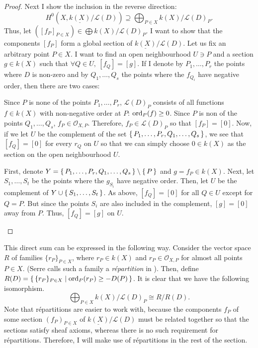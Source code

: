 \begin{proof}
  Next I show the inclusion in the reverse direction:
  \[
    H^{0}(X,\underline{k(X)}/\mathcal{L}(D))\supseteq\bigoplus_{P\in X}
    k(X)/\mathcal{L}(D)_{P}.
  \]
  Thus, let $([f_{P}]_{P\in X})\in\displaystyle\bigoplus
  k(X)/\mathcal{L}(D)_{P}$. I want to show that the components $[f_{P}]$
  form a global section of $\underline{k(X)}/\mathcal{L}(D)$. Let us
  fix an arbitrary point $P\in X$. I want to find an open neighbourhood
  $U\ni P$ and a section $g\in k(X)$ such that $\forall Q\in U,\ [f_{Q}]=[g]$.
  If I denote by $P_{1},\ldots,P_{r}$ the points where $D$ is non-zero
  and by $Q_{1},\ldots,Q_{s}$ the points where the $f_{Q_{i}}$ have negative
  order, then there are two cases:
  \begin{description}[style=nextline]
    \item[$P\not\in\set{P_{1},\ldots,P_{r},Q_{1},\ldots,Q_{s}}\big)$]
          Since $P$ is none of the points $P_{1},\ldots,P_{r}$,
          $\mathcal{L}(D)_{P}$ consists of all functions $f\in k(X)$
          with non-negative order at $P$: $\operatorname{ord}_{P}(f)\geq 0$.
          Since $P$ is non of the points $Q_{1},\ldots,Q_{s}$,
          $f_{P}\in\mathscr{O}_{X,P}$. Therefore, $f_{P}\in\mathcal{L}(D)_{P}$
          so that $[f_{P}]=[0]$. Now, if we let $U$ be the complement of
          the set $\set{P_{1},\ldots,P_{r},Q_{1},\ldots,Q_{s}}$, we see
          that $[f_{Q}]=[0]$ for every $r_{Q}$ on $U$ so that we can simply
          choose $0\in k(X)$ as the section on the open neighbourhood $U$.
    \item[$P\in\set{P_{1},\ldots,P_{r},Q_{1},\ldots,Q_{s}}\big)$]
          First, denote $Y=\set{P_{1},\ldots,P_{r},Q_{1},\ldots,Q_{s}}
          \setminus \set{P}$ and $g=f_{P}\in k(X)$. Next, let
          $S_{1},\ldots,S_{t}$ be the points where the $g_{S_{i}}$ have
          negative order. Then, let $U$ be the complement of
          $Y\cup \set{S_{1},\ldots,S_{t}}$. As above, $[f_{Q}]=[0]$ for all
          $Q\in U$ except for $Q=P$. But since the points $S_{i}$ are also
          included in the complement, $[g]=[0]$ away from $P$. Thus,
          $[f_{Q}]=[g]$ on $U$.
  \end{description}
\end{proof}
This direct sum can be expressed in the following way. Consider the
vector space $R$ of families $\{r_{P}\}_{P\in X}$, where $r_{P}\in k(X)$ and
$r_{P}\in\mathscr{O}_{X,P}$ for almost all points $P\in X$.
(Serre calls such a family a \emph{r\'epartition} in \cite{serre}).
Then, define $R(D)=\set{\{r_{P}\}_{P\in X}\mid \operatorname{ord}_{P}(r_{P})\geq -D(P)}$.
It is clear that we have the following isomorphism.
\[
  \bigoplus_{P\in X}k(X)/\mathcal{L}(D)_{P}\cong R/R(D).
\]
Note that r\'epartitions are easier to work with, because the components
$f_{P}$ of some section $(f_{P})_{P\in X}$ of
$\underline{k(X)}/\mathcal{L}(D)$ must be related together so that the
sections satisfy sheaf axioms, whereas there is no such requirement for
r\'epartitions. Therefore, I will make use of r\'epartitions in the rest
of the section.

